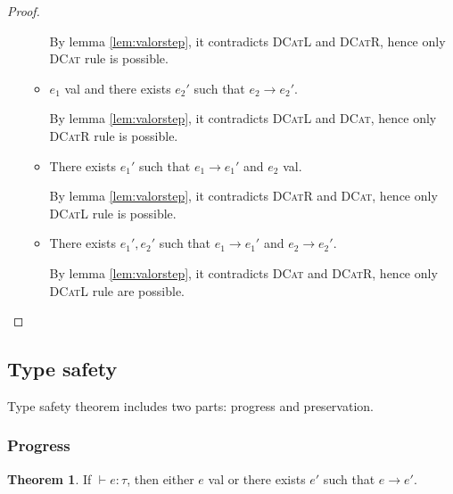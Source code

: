 \documentclass{article}
\theoremstyle{definition}
\newtheorem{theorem}{Theorem}[section]
\begin{document}
\begin{proof}
\begin{itemize}
\begin{itemize}
                        By lemma \ref{lem:valorstep}, it contradicts \textsc{DCatL} and \textsc{DCatR}, hence only \textsc{DCat} rule is possible.
                  \item $e_1$ \textsf{val} and there exists $e_2'$ such that $e_2\longrightarrow e_2'$.

                        By lemma \ref{lem:valorstep}, it contradicts \textsc{DCatL} and \textsc{DCat}, hence only \textsc{DCatR} rule is possible.
                  \item There exists $e_1'$ such that $e_1\longrightarrow e_1'$ and $e_2$ \textsf{val}.

                        By lemma \ref{lem:valorstep}, it contradicts \textsc{DCatR} and \textsc{DCat}, hence only \textsc{DCatL} rule is possible.
                  \item There exists $e_1',e_2'$ such that $e_1\longrightarrow e_1'$ and $e_2\longrightarrow e_2'$.

                        By lemma \ref{lem:valorstep}, it contradicts \textsc{DCat} and \textsc{DCatR}, hence only \textsc{DCatL} rule are possible.
              \end{itemize}
    \end{itemize}
\end{proof}

\subsection{Type safety}

Type safety theorem includes two parts: progress and preservation.

\subsubsection*{Progress}

\begin{theorem}
    If $\vdash e:\tau$, then either $e$ \textsf{val} or there exists $e'$ such that $e\longrightarrow e'$.
\end{theorem}
\end{document}
